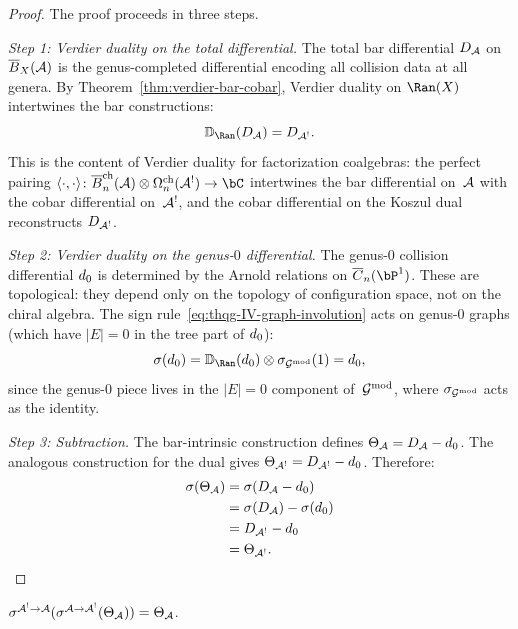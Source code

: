 \begin{proof}
The proof proceeds in three steps.

\emph{Step 1: Verdier duality on the total differential.}
The total bar differential $D_{\mathcal{A}}$ on $\overline{B}_X(\mathcal{A})$ is the
genus-completed differential encoding all collision data at all
genera. By Theorem~\ref{thm:verdier-bar-cobar}, Verdier duality on
$\Ran(X)$ intertwines the bar constructions:
\begin{equation}\label{eq:thqg-IV-verdier-total}
\VD_{\Ran}(D_\cA) = D_{\cA^!}.
\end{equation}
This is the content of Verdier duality for factorization coalgebras:
the perfect pairing
$\langle \cdot, \cdot \rangle\colon
\barB^{\mathrm{ch}}_n(\cA) \otimes \Omega^{\mathrm{ch}}_n(\cA^!)
\to \bC$ intertwines the bar differential on~$\mathcal{A}$ with the cobar
differential on~$\mathcal{A}^!$, and the cobar differential on the Koszul
dual reconstructs $D_{\mathcal{A}^!}$.

\emph{Step 2: Verdier duality on the genus-$0$ differential.}
The genus-$0$ collision differential $d_0$ is determined by the
Arnold relations on $\overline{C}_n(\bP^1)$. These are topological:
they depend only on the topology of configuration space, not on the
chiral algebra. The sign rule~\eqref{eq:thqg-IV-graph-involution}
acts on genus-$0$ graphs (which have $|E| = 0$ in the tree part of
$d_0$):
\begin{equation}\label{eq:thqg-IV-verdier-dzero}
\sigma(\dzero) = \VD_{\Ran}(\dzero) \otimes \sigma_{\Gmod}(1) = \dzero,
\end{equation}
since the genus-$0$ piece lives in the $|E| = 0$ component of~$\mathcal{G}^{\mathrm{mod}}$,
where $\sigma_{\mathcal{G}^{\mathrm{mod}}}$ acts as the identity.

\emph{Step 3: Subtraction.}
The bar-intrinsic construction defines $\Theta_{\mathcal{A}} = D_{\mathcal{A}} - d_0$.
The analogous construction for the dual gives
$\Theta_{\mathcal{A}^!} = D_{\mathcal{A}^!} - d_0$. Therefore:
\begin{align}
\sigma(\Theta_{\mathcal{A}})
&= \sigma(D_{\mathcal{A}} - d_0) \notag \\
&= \sigma(D_{\mathcal{A}}) - \sigma(d_0) \notag \\
&= D_{\mathcal{A}^!} - d_0 \notag \\
&= \Theta_{\mathcal{A}^!}.
\label{eq:thqg-IV-theta-derivation} \qedhere
\end{align}
\end{proof}

\begin{corollary}
\label{cor:thqg-IV-involutivity}
$\sigma^{\mathcal{A}^! \to \mathcal{A}}(\sigma^{\mathcal{A} \to \mathcal{A}^!}(\Theta_{\mathcal{A}}))
= \Theta_{\mathcal{A}}$.
\end{corollary}

